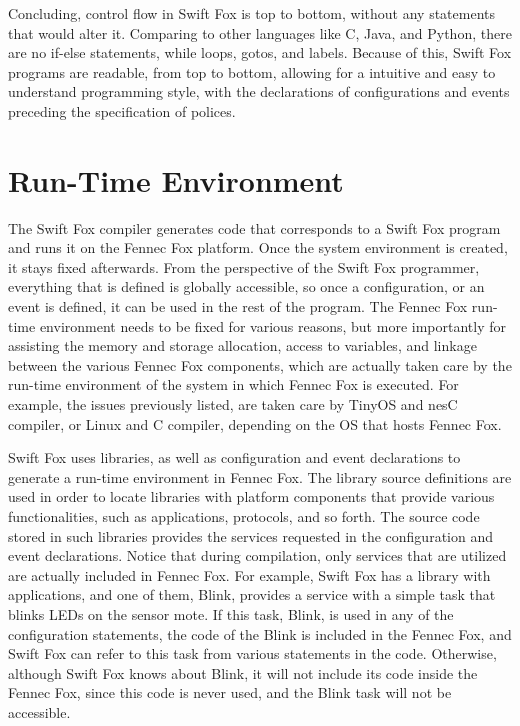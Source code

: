 \documentclass[11pt]{article}
\begin{document}
Concluding, control flow in Swift Fox is top to bottom, without any 
statements that would alter it. Comparing to other languages like C, Java, 
and Python, there are no if-else statements, while loops, gotos, and
labels. Because of this, Swift Fox programs are readable, from top to
bottom, allowing for a intuitive and easy to understand programming style, 
with the declarations of configurations and events preceding the
specification of polices.





\section{Run-Time Environment}
\label{sec:runtimeenv}

The Swift Fox compiler generates code that corresponds to a Swift Fox
program and runs it on the Fennec Fox platform. Once the system environment
is created, it stays fixed afterwards. From the perspective of the Swift
Fox programmer, everything that is defined is globally accessible, so once 
a configuration, or an event is defined, it can be used in the rest of the 
program. The Fennec Fox run-time environment needs to be fixed for various
reasons, but more importantly for assisting the memory and storage
allocation, access to variables, and linkage between the various Fennec Fox
components, which are actually taken care by the run-time environment of
the system in which Fennec Fox is executed. For example, the issues
previously listed, are taken care by TinyOS and nesC compiler, or Linux and
C compiler, depending on the OS that hosts Fennec Fox.

Swift Fox uses libraries, as well as configuration and event declarations
to generate a run-time environment in Fennec Fox. The library source
definitions are used in order to locate libraries with platform components 
that provide various functionalities, such as applications, protocols, and
so forth. The source code stored in such libraries provides the services
requested in the configuration and event declarations. Notice that during
compilation, only services that are utilized are actually included in
Fennec Fox. For example, Swift Fox has a library with applications, and one
of them, Blink, provides a service with a simple task that blinks LEDs on
the sensor mote. If this task, Blink, is used in any of the configuration 
statements, the code of the Blink is included in the Fennec Fox, and Swift 
Fox can refer to this task from various statements in the code. Otherwise, 
although Swift Fox knows about Blink, it will not include its code inside 
the Fennec Fox, since this code is never used, and the Blink task will
not be accessible.
\end{document}

